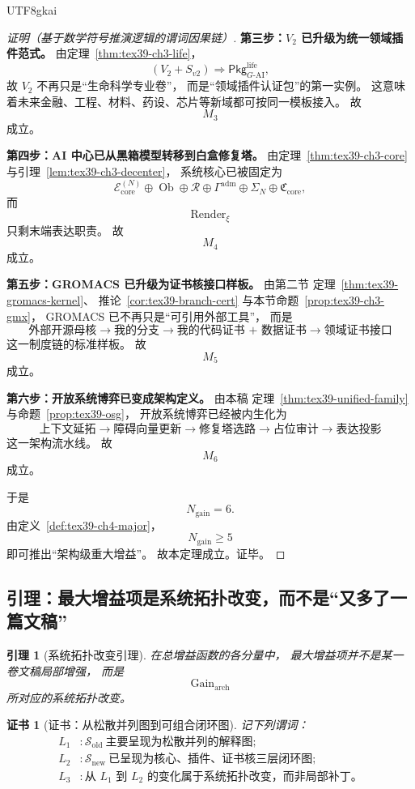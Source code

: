 \documentclass[12pt]{article}
\newtheorem{lemma}{引理}[section]
\newtheorem{Certificate}{证书}[section]
\newcommand{\Ob}{\operatorname{Ob}}
\begin{document}
\begin{CJK*}{UTF8}{gkai}
\begin{proof}[证明（基于数学符号推演逻辑的谓词因果链）]
\textbf{第三步：$V_2$ 已升级为统一领域插件范式。}
由定理~\ref{thm:tex39-ch3-life}，
\[
  (V_2+S_{v2})
  \Longrightarrow
  \mathsf{Pkg}_{G\text{-AI}}^{\mathrm{life}},
\]
故 $V_2$ 不再只是“生命科学专业卷”，
而是“领域插件认证包”的第一实例。
这意味着未来金融、工程、材料、药设、芯片等新域都可按同一模板接入。
故
\[
  M_3
\]
成立。

\textbf{第四步：AI 中心已从黑箱模型转移到白盒修复塔。}
由定理~\ref{thm:tex39-ch3-core}
与引理~\ref{lem:tex39-ch3-decenter}，
系统核心已被固定为
\[
  \mathcal E_{\mathrm{core}}^{(N)}
  \oplus
  \Ob
  \oplus
  \mathcal R
  \oplus
  \Gamma^{\mathrm{adm}}
  \oplus
  \Sigma_N
  \oplus
  \mathfrak C_{\mathrm{core}},
\]
而
\[
  \operatorname{Render}_{\xi}
\]
只剩末端表达职责。
故
\[
  M_4
\]
成立。

\textbf{第五步：GROMACS 已升级为证书核接口样板。}
由第二节
定理~\ref{thm:tex39-gromacs-kernel}、
推论~\ref{cor:tex39-branch-cert}
与本节命题~\ref{prop:tex39-ch3-gmx}，
GROMACS 已不再只是“可引用外部工具”，
而是
\[
  \text{外部开源母核}
  \to
  \text{我的分支}
  \to
  \text{我的代码证书 + 数据证书}
  \to
  \text{领域证书接口}
\]
这一制度链的标准样板。
故
\[
  M_5
\]
成立。

\textbf{第六步：开放系统博弈已变成架构定义。}
由本稿
定理~\ref{thm:tex39-unified-family}
与命题~\ref{prop:tex39-osg}，
开放系统博弈已经被内生化为
\[
  \text{上下文延拓}
  \to
  \text{障碍向量更新}
  \to
  \text{修复塔选路}
  \to
  \text{占位审计}
  \to
  \text{表达投影}
\]
这一架构流水线。
故
\[
  M_6
\]
成立。

于是
\[
  N_{\mathrm{gain}}=6.
\]
由定义~\ref{def:tex39-ch4-major}，
\[
  N_{\mathrm{gain}}\ge 5
\]
即可推出“架构级重大增益”。
故本定理成立。证毕。
\end{proof}

\subsection{引理：最大增益项是系统拓扑改变，而不是“又多了一篇文稿”}
\label{subsec:tex39-ch4-lemma}

\begin{lemma}[系统拓扑改变引理]
\label{lem:tex39-ch4-topology}
在总增益函数的各分量中，
最大增益项并不是某一卷文稿局部增强，
而是
\[
  \operatorname{Gain}_{\mathrm{arch}}
\]
所对应的系统拓扑改变。
\end{lemma}

\begin{Certificate}[证书：从松散并列图到可组合闭环图]
\label{cert:tex39-ch4-topology}
记下列谓词：
\[
\begin{aligned}
  L_1 &: \mathcal S_{\mathrm{old}}\ \text{主要呈现为松散并列的解释图};\\
  L_2 &: \mathcal S_{\mathrm{new}}\ \text{已呈现为核心、插件、证书核三层闭环图};\\
  L_3 &: \text{从 }L_1\text{ 到 }L_2\text{ 的变化属于系统拓扑改变，而非局部补丁。}
\end{aligned}
\]
\end{Certificate}


\end{CJK*}
\end{document}
